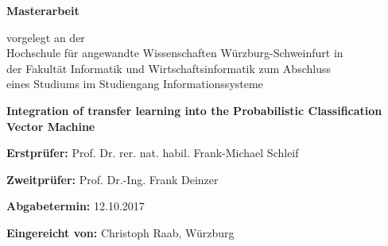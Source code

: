 \begin{titlepage}
\vspace*{2cm}
\centering 
	{\Huge\bfseries Masterarbeit\par}
	\vspace{1.5cm}
	{vorgelegt an der\\
		Hochschule für angewandte Wissenschaften Würzburg-Schweinfurt in\\
		der Fakultät Informatik und Wirtschaftsinformatik zum Abschluss\\
		eines Studiums im Studiengang Informationssysteme
	\par}
	\vspace{2.5cm}
	{\Large\bfseries Integration of transfer learning into the Probabilistic Classification Vector Machine \par}
	\vspace{2cm}

\raggedright
	\vfill
	\textbf{Erstprüfer:} Prof. Dr. rer. nat. habil. Frank-Michael Schleif\par
	\textbf{Zweitprüfer:} Prof. Dr.-Ing. Frank Deinzer\par
	\textbf{Abgabetermin:} 12.10.2017\par
	
\raggedleft
	\vfill
	\textbf{Eingereicht von:} Christoph Raab, Würzburg\par
	
\end{titlepage}